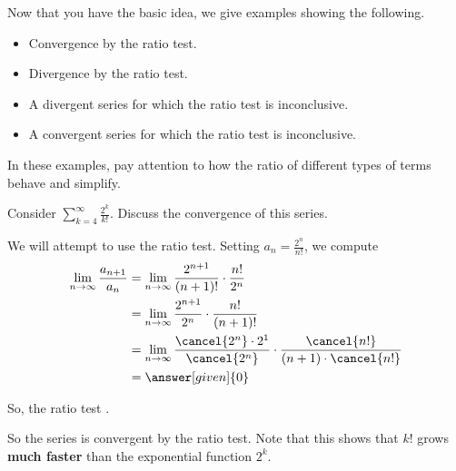 \documentclass{ximera}
\begin{document}
Now that you have the basic idea, we give examples showing the following.
\begin{itemize}
\item Convergence by the ratio test.
\item Divergence by the ratio test.
\item A divergent series for which the ratio test is inconclusive.
\item A convergent series for which the ratio test is inconclusive.
\end{itemize}
In these examples, pay attention to how the ratio of different types of terms behave and simplify.



\begin{example}
  Consider $  \sum_{k=4}^\infty \frac{2^k}{k!}$.  Discuss the convergence of this series.
  \begin{explanation}
    We will attempt to use the ratio test. Setting $a_n = \frac{2^n}{n!}$, we compute
\begin{align*}
    \lim_{n \to \infty} \frac{a_{n+1}}{a_n} &=  \lim_{n \to \infty} \frac{2^{n+1}}{(n+1)!} \cdot \frac{n!}{2^n} \\
    &=  \lim_{n \to \infty} \frac{2^{n+1}}{2^n}  \cdot \frac{n!}{(n+1)!} \\
    &=  \lim_{n \to \infty} \frac{\cancel{2^n}\cdot 2^1}{\cancel{2^n}}  \cdot \frac{\cancel{n!}}{(n+1) \cdot \cancel{n!} } \\
    &= \answer[given]{0}
\end{align*}

    So, the ratio test
	 .	
	 \begin{hint}
	 
	   So the series is convergent by the ratio test.  Note that
           this shows that $k!$ grows \textbf{much faster} than the
           exponential function $2^k$.
	 \end{hint}
  \end{explanation}
\end{example}
\end{document}
